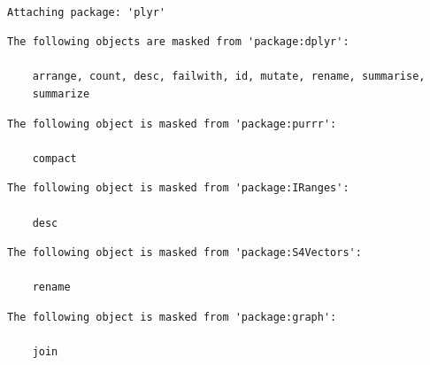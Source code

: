 \documentclass[]{article}
\begin{document}
\begin{verbatim}

Attaching package: 'plyr'
\end{verbatim}

\begin{verbatim}
The following objects are masked from 'package:dplyr':

    arrange, count, desc, failwith, id, mutate, rename, summarise,
    summarize
\end{verbatim}

\begin{verbatim}
The following object is masked from 'package:purrr':

    compact
\end{verbatim}

\begin{verbatim}
The following object is masked from 'package:IRanges':

    desc
\end{verbatim}

\begin{verbatim}
The following object is masked from 'package:S4Vectors':

    rename
\end{verbatim}

\begin{verbatim}
The following object is masked from 'package:graph':

    join
\end{verbatim}
\end{document}
